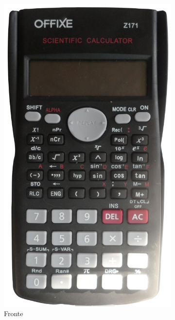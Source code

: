 \begin{figure}
	\begin{subfigure}[b]{.5\linewidth}
	\centering\includegraphics{offixe/SAM_3719_crop2.jpg}%
		\caption{Fronte}\label{fig:OFFIXEfront}
	\end{subfigure}%
	\begin{subfigure}[b]{.5\linewidth}

\end{subfigure}
\end{figure}
